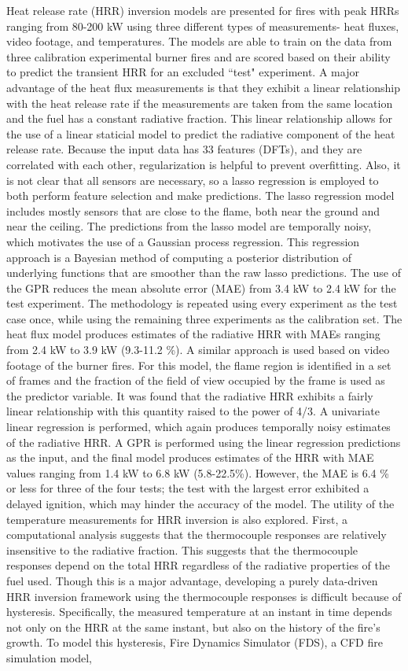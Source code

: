\documentclass{article}
\begin{document}
Heat release rate (HRR) inversion models are presented for fires with peak HRRs ranging from 80-200 kW using three different types of measurements- heat fluxes, video footage, and temperatures. The models are able to train on the data from three calibration experimental burner fires and are scored based on their ability to predict the transient HRR for an excluded ``test" experiment. A major advantage of the heat flux measurements is that they exhibit a linear relationship with the heat release rate if the measurements are taken from the same location and the fuel has a constant radiative fraction. This linear relationship allows for the use of a linear staticial model to predict the radiative component of the heat release rate. Because the input data has 33 features (DFTs), and they are correlated with each other, regularization is helpful to prevent overfitting. Also, it is not clear that all sensors are necessary, so a lasso regression is employed to both perform feature selection and make predictions. The lasso regression model includes mostly sensors that are close to the flame, both near the ground and near the ceiling. The predictions from the lasso model are temporally noisy, which motivates the use of a Gaussian process regression. This regression approach is a Bayesian method of computing a posterior distribution of underlying functions that are smoother than the raw lasso predictions. The use of the GPR reduces the mean absolute error (MAE) from 3.4 kW to 2.4 kW for the test experiment. The methodology is repeated using every experiment as the test case once, while using the remaining three experiments as the calibration set. The heat flux model produces estimates of the radiative HRR with MAEs ranging from 2.4 kW to 3.9 kW (9.3-11.2 \%). A similar approach is used based on video footage of the burner fires. For this model, the flame region is identified in a set of frames and the fraction of the field of view occupied by the frame is used as the predictor variable. It was found that the radiative HRR exhibits a fairly linear relationship with this quantity raised to the power of 4/3. A univariate linear regression is performed, which again produces temporally noisy estimates of the radiative HRR. A GPR is performed using the linear regression predictions as the input, and the final model produces estimates of the HRR with MAE values ranging from 1.4 kW to 6.8 kW (5.8-22.5\%). However, the MAE is 6.4 \% or less for three of the four tests; the test with the largest error exhibited a delayed ignition, which may hinder the accuracy of the model. The utility of the temperature measurements for HRR inversion is also explored. First, a computational analysis suggests that the thermocouple responses are relatively insensitive to the radiative fraction. This suggests that the thermocouple responses depend on the total HRR regardless of the radiative properties of the fuel used. Though this is a major advantage, developing a purely data-driven HRR inversion framework using the thermocouple responses is difficult because of hysteresis. Specifically, the measured temperature at an instant in time depends not only on the HRR at the same instant, but also on the history of the fire's growth. To model this hysteresis, Fire Dynamics Simulator (FDS), a CFD fire simulation model, 
\end{document}
